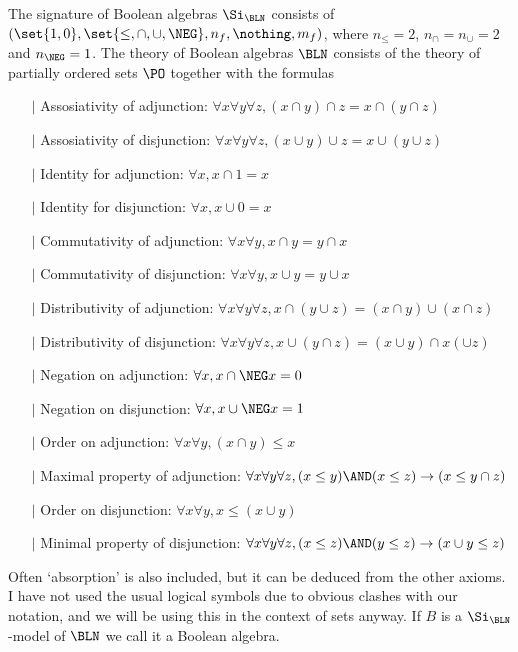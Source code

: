 \begin{dfn}
    The signature of Boolean algebras $\Si_\BLN$ consists of 
    $(\set{1,0},\set{\leq,\cap,\cup,\NEG},n_f,\nothing,m_f)$,
    where $n_\leq = 2$, $n_\cap = n_\cup = 2$ and $n_\NEG = 1$.
    The theory of Boolean algebras $\BLN$ consists of the theory of 
    partially ordered sets $\PO$ together with the formulas
    \begin{itemize}
        \item[$\vert$] Assosiativity of adjunction: 
            $\forall x \forall y \forall z, 
            (x \cap y) \cap z = x \cap (y \cap z)$
        \item[$\vert$] Assosiativity of disjunction: 
            $\forall x \forall y \forall z, 
            (x \cup y) \cup z = x \cup (y \cup z)$
        \item[$\vert$] Identity for adjunction:
            $\forall x, x \cap 1 = x$ 
        \item[$\vert$] Identity for disjunction:
            $\forall x, x \cup 0 = x$ 
        \item[$\vert$] Commutativity of adjunction: 
            $\forall x \forall y, x \cap y = y \cap x$
        \item[$\vert$] Commutativity of disjunction: 
            $\forall x \forall y, x \cup y = y \cup x$
        \item[$\vert$] Distributivity of adjunction:
            $\forall x \forall y \forall z, 
            x \cap (y \cup z) = (x \cap y) \cup (x \cap z)$
        \item[$\vert$] Distributivity of disjunction:
            $\forall x \forall y \forall z, 
            x \cup (y \cap z) = (x \cup y) \cap x (\cup z)$
        \item[$\vert$] Negation on adjunction: 
            $\forall x, x \cap \NEG x = 0$ 
        \item[$\vert$] Negation on disjunction: 
            $\forall x, x \cup \NEG x = 1$ 
        \item[$\vert$] Order on adjunction:
            $\forall x \forall y, (x \cap y) \leq x$
        \item[$\vert$] Maximal property of adjunction:
            $\forall x \forall y \forall z, 
            (x \leq y) \AND (x \leq z) \to (x \leq y \cap z)$ 
        \item[$\vert$] Order on disjunction:
            $\forall x \forall y, x \leq (x \cup y)$ 
        \item[$\vert$] Minimal property of disjunction:
            $\forall x \forall y \forall z, 
            (x \leq z) \AND (y \leq z) \to (x \cup y \leq z)$ 
        \end{itemize}
    Often `absorption' is also included, 
    but it can be deduced from the other axioms.
    I have not used the usual logical symbols due to obvious clashes with 
    our notation, 
    and we will be using this in the context of sets anyway.
    If $B$ is a $\Si_\BLN$-model of $\BLN$ we call it a Boolean algebra.
\end{dfn}
